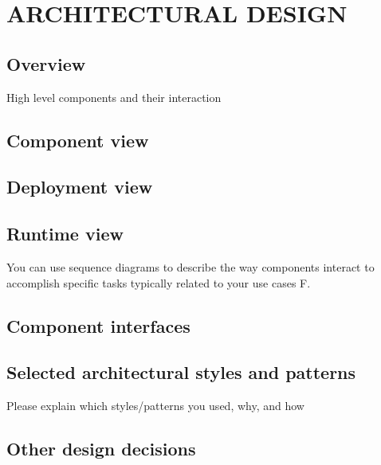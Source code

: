\section{ARCHITECTURAL DESIGN}
	\subsection{Overview}
	High level components and their interaction
	\subsection{Component view} 
	\subsection{Deployment view}
	\subsection{Runtime view}
	You can use sequence diagrams to describe the way components interact to accomplish specific tasks typically related to your use cases F. 
	\subsection{Component interfaces} 
	\subsection{Selected architectural styles and patterns}
	Please explain which styles/patterns you used, why, and how   
	\subsection{Other design decisions } 

    

